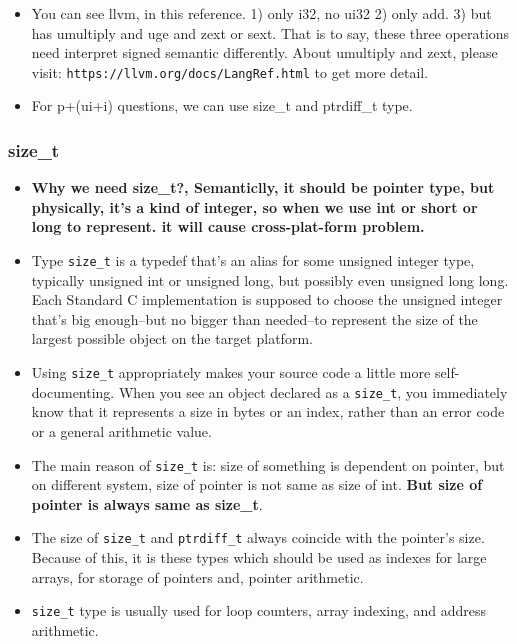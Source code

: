 \documentclass[a4paper,11pt,twoside]{book}
\begin{document}
\begin{itemize}
	\item You can see llvm, in this reference. 1) only i32, no ui32 2) only add.  3) but has umultiply and uge and zext or sext. That is to say, these three operations need interpret signed semantic differently.  About umultiply and zext, please visit: \verb|https://llvm.org/docs/LangRef.html| to get more detail.
	
	\item For p+(ui+i) questions, we can use size\_t and ptrdiff\_t type. 
\end{itemize}

\subsubsection{size\_t}
\begin{itemize}
	\item \textbf{Why we need size\_t?, Semanticlly, it should be pointer type, but physically, it's a kind of integer, so when we use int or short or long to represent. it will cause cross-plat-form problem.}
	
	\item Type \texttt{size\_t} is a typedef that's an alias for some unsigned integer type, typically unsigned int or unsigned long, but possibly even unsigned long long. Each Standard C implementation is supposed to choose the unsigned integer that's big enough--but no bigger than needed--to represent the size of the largest possible object on the target platform.
	
	\item Using \texttt{size\_t} appropriately makes your source code a little more self-documenting. When you see an object declared as a \texttt{size\_t}, you immediately know that it represents a size in bytes or an index, rather than an error code or a general arithmetic value.
	
	\item The main reason of \texttt{size\_t} is: size of something is dependent on pointer, but on different system, size of pointer is not same as size of int.  \textbf{But size of pointer is always same as size\_t}.
	
	\item The size of \texttt{size\_t} and \texttt{ptrdiff\_t} always coincide with the pointer's size. Because of this, it is these types which should be used as indexes for large arrays, for storage of pointers and, pointer arithmetic.
	
	\item \texttt{size\_t} type is usually used for loop counters, array indexing, and address arithmetic.
			

\end{itemize}
\end{document}
